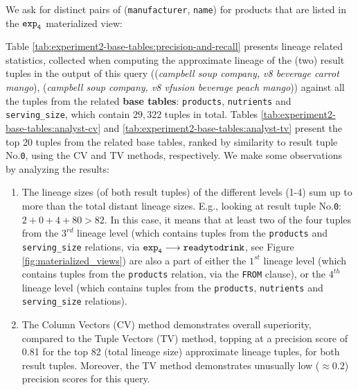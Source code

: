 \begin{experiment-withrun}





\end{experiment-withrun}


\begin{experiment-withrun}\label{advanced-experiment:2}
We ask for distinct pairs of (\texttt{manufacturer}, \texttt{name}) for products that are listed in the $\texttt{exp}\sb\texttt{4}$ materialized view:\footnotemark


Table \ref{tab:experiment2-base-tables:precision-and-recall} presents lineage related statistics, collected when computing the approximate lineage of the (two) result tuples in the output of this query ((\textit{campbell soup company, v8 beverage carrot mango}), (\textit{campbell soup company, v8 vfusion beverage peach mango})) against all the tuples from the related \textbf{base tables}: \texttt{products}, \texttt{nutrients} and \texttt{serving\_size}, which contain $29,322$ tuples in total. Tables \ref{tab:experiment2-base-tables:analyst-cv} and \ref{tab:experiment2-base-tables:analyst-tv} present the top 20 tuples from the related base tables, ranked by similarity to result tuple No.\texttt{0}, using the CV and TV methods, respectively. We make some observations by analyzing the results:
\begin{enumerate}
    \item The lineage sizes (of both result tuples) of the different levels (1-4) sum up to more than the total distant lineage sizes. E.g., looking at result tuple No.\texttt{0}: $2 + 0 + 4 + 80 > 82$. In this case, it means that at least two of the four tuples from the $3^{rd}$ lineage level (which contains tuples from the \texttt{products} and \texttt{serving\_size} relations, via $\texttt{exp}\sb\texttt{4}\longrightarrow\texttt{readytodrink}$, see Figure \ref{fig:materialized_views}) are also a part of either the $1^{st}$ lineage level (which contains tuples from the \texttt{products} relation, via the \texttt{FROM} clause), or the $4^{th}$ lineage level (which contains tuples from the \texttt{products}, \texttt{nutrients} and \texttt{serving\_size} relations).
    \item The Column Vectors (CV) method demonstrates overall superiority, compared to the Tuple Vectors (TV) method, topping at a precision score of 0.81 for the top 82 (total lineage size) approximate lineage tuples, for both result tuples.  Moreover, the TV method demonstrates unusually low  ($\approx0.2$) precision scores for this query.

\end{enumerate}
\end{experiment-withrun}
